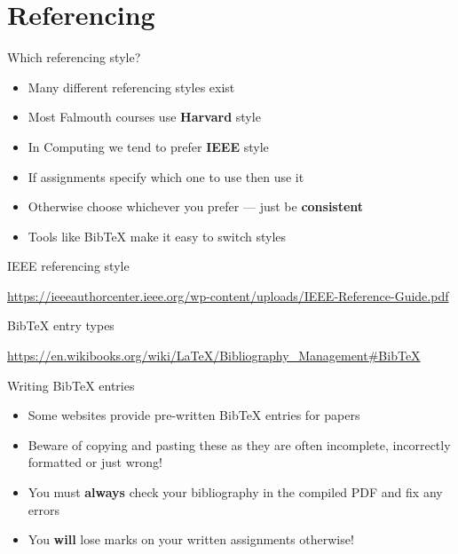 \part{Referencing}
\frame{\partpage}

\begin{frame}{Which referencing style?}
	\begin{itemize}
		\pause\item Many different referencing styles exist
		\pause\item Most Falmouth courses use \textbf{Harvard} style
		\pause\item In Computing we tend to prefer \textbf{IEEE} style
		\pause\item If assignments specify which one to use then use it
		\pause\item Otherwise choose whichever you prefer --- just be \textbf{consistent}
		\pause\item Tools like BibTeX make it easy to switch styles
	\end{itemize}
\end{frame}

\begin{frame}{IEEE referencing style}
	\begin{center}
		\small\url{https://ieeeauthorcenter.ieee.org/wp-content/uploads/IEEE-Reference-Guide.pdf}
	\end{center}
\end{frame}

\begin{frame}{BibTeX entry types}
	\begin{center}
		\small\url{https://en.wikibooks.org/wiki/LaTeX/Bibliography_Management\#BibTeX}
	\end{center}
\end{frame}

\begin{frame}{Writing BibTeX entries}
	\begin{itemize}
		\pause\item Some websites provide pre-written BibTeX entries for papers
		\pause\item Beware of copying and pasting these as they are often incomplete, incorrectly formatted or just wrong!
		\pause\item You must \textbf{always} check your bibliography in the compiled PDF and fix any errors
		\pause\item You \textbf{will} lose marks on your written assignments otherwise!
	\end{itemize}
\end{frame}

